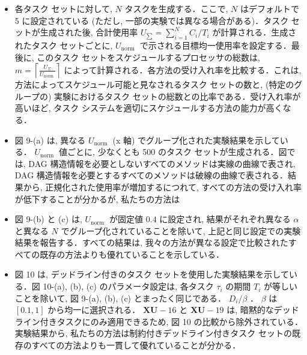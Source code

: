 \begin{frame}{}
    \begin{itemize}
        \item 各タスク セットに対して, $N$ タスクを生成する．ここで, $N$ はデフォルトで 5 に設定されている (ただし, 一部の実験では異なる場合がある)．タスク セットが生成された後, 合計使用率 $U_{\sum}=\sum_{i=1}^{N} C_{i} / T_{i}$ が計算される．生成されたタスク セットごとに, $U_{\text {norm }}$ で示される目標均一使用率を設定する．最後に, このタスク セットをスケジュールするプロセッサの総数は, $m=\left\lceil\frac{U_{\Sigma}}{U_{\text {norm }}}\right\rceil$ によって計算される．各方法の受け入れ率を比較する．これは, 方法によってスケジュール可能と見なされるタスク セットの数と, (特定のグループの) 実験におけるタスク セットの総数との比率である．受け入れ率が高いほど, タスク システムを適切にスケジュールする方法の能力が高くなる．
    \end{itemize}
\end{frame}

\begin{frame}{}
    \begin{itemize}
        \item 図 9-(a) は, 異なる $U_{\text {norm }}$ (x 軸) でグループ化された実験結果を示している． $U_{\text {norm }}$ 値ごとに, 少なくとも 500 のタスク セットが生成される．図では, DAG 構造情報を必要としないすべてのメソッドは実線の曲線で表され, DAG 構造情報を必要とするすべてのメソッドは破線の曲線で表される．結果から, 正規化された使用率が増加するにつれて, すべての方法の受け入れ率が低下することが分かるが, 私たちの方法は
    \end{itemize}
\end{frame}

\begin{frame}{}
    \begin{itemize}
        \item 図 9-(b) と (c) は, $U_{\text {norm }}$ が固定値 $0.4$ に設定され, 結果がそれぞれ異なる $\alpha$ と異なる $N$ でグループ化されていることを除いて, 上記と同じ設定での実験結果を報告する．すべての結果は, 我々の方法が異なる設定で比較されたすべての既存の方法よりも優れていることを示している．
    \end{itemize}
\end{frame}

\begin{frame}{}
    \begin{itemize}
        \item 図 10 は, デッドライン付きのタスク セットを使用した実験結果を示している．図 10-(a), (b), (c) のパラメータ設定は, 各タスク $\tau_{i}$ の期間 $T_{i}$ が等しいことを除いて, 図 9-(a), (b), (c) とまったく同じである． $D_{i} / \beta$ ． $\beta$ は $[0.1,1]$ から均一に選択される． $\mathbf{X U}-16$ と $\mathbf{X U}-19$ は, 暗黙的なデッドライン付きタスクにのみ適用できるため, 図 10 の比較から除外されている．実験結果から, 私たちの方法は制約付きデッドライン付きタスク セットの既存のすべての方法よりも一貫して優れていることが分かる．
    \end{itemize}
\end{frame}


